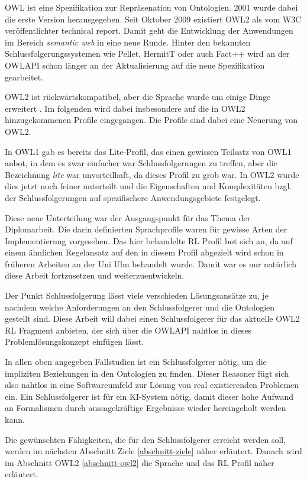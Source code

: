 OWL ist eine Spezifikation zur Repräsenation von Ontologien. 2001 wurde dabei die erste Version herausgegeben. Seit Oktober 2009 existiert OWL2 als vom W3C veröffentlichter technical report. Damit geht die Entwicklung der Anwendungen im Bereich \emph{semantic web} in eine neue Runde. Hinter den bekannten Schlussfolgerungssystemen wie Pellet, HermitT oder auch Fact++ wird an der OWLAPI schon länger an der Aktualisierung auf die neue Spezifikation gearbeitet.

OWL2 ist rückwärtskompatibel, aber die Sprache wurde um einige Dinge erweitert \cite{Golbreich2008}. Im folgenden wird dabei  insbesondere auf die in OWL2 hinzugekommenen Profile eingegangen. Die Profile sind dabei eine Neuerung von OWL2.

In OWL1 gab es bereits das Lite-Profil, das einen gewissen Teilsatz von OWL1 anbot, in dem es zwar einfacher war Schlussfolgerungen zu treffen, aber die Bezeichnung \emph{lite} war unvorteilhaft, da dieses Profil zu grob war. In OWL2 wurde dies jetzt noch feiner unterteilt und die Eigenschaften und Komplexitäten bzgl. der Schlussfolgerungen auf spezifischere Anwendungsgebiete festgelegt.

Diese neue Unterteilung war der Ausgangspunkt für das Thema der Diplomarbeit. Die darin definierten Sprachprofile waren für gewisse Arten der Implementierung vorgesehen. Das hier behandelte RL Profil bot sich an, da auf einem ähnlichen Regelansatz auf den in diesem Profil abgezielt wird schon in früheren Arbeiten an der Uni Ulm behandelt wurde. Damit war es nur natürlich diese Arbeit fortzusetzen und weiterzuentwickeln.

Der Punkt Schlussfolgerung lässt viele verschieden Lösungsansätze zu, je nachdem welche Anforderungen an den Schlussfolgerer und die Ontologien gestellt sind. Diese Arbeit will dabei einen Schlussfolgerer für das aktuelle  OWL2 RL Fragment anbieten, der sich über die OWLAPI nahtlos in dieses Problemlösungskonzept einfügen lässt.

In allen oben angegeben Fallstudien ist ein Schlussfolgerer nötig, um die impliziten Beziehungen in den Ontologien zu finden. Dieser Reasoner fügt sich also nahtlos in eine Softwareumfeld zur Lösung von real existierenden Problemen ein. Ein Schlussfolgerer ist für ein KI-System nötig, damit dieser hohe Aufwand an Formalismen durch aussagekräftige Ergebnisse wieder hereingeholt werden kann.

Die gewünschten Fähigkeiten, die für den Schlussfolgerer erreicht werden soll, werden im nächsten Abschnitt Ziele \ref{abschnitt-ziele} näher erläutert. Danach wird im Abschnitt OWL2 \ref{abschnitt-owl2} die Sprache und das RL Profil näher erläutert.

